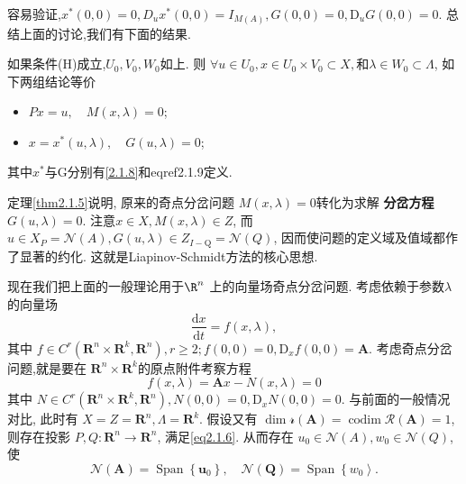 容易验证,\(x^{*}(0,0)=0, D_{u} x^{*}(0,0)=I_{M(A)},G(0,0)=0,\mathrm{D}_{u} G(0,0)=0\).
总结上面的讨论,我们有下面的结果.
\begin{theorem}
  \label{thm2.1.5}
  如果条件(H)成立,\(U_{0}, V_{0}, W_{0}\)如上.
  则
  \(\forall u \in U_{0}, x \in U_{0} \times V_{0} \subset X, \text{和}
  \lambda \in W_{0} \subset \Lambda\),
  如下两组结论等价
\begin{itemize}
\item \(P x=u, \quad M(x, \lambda)=0\);
\item \(x=x^{*}(u, \lambda), \quad G(u, \lambda)=0\);
\end{itemize}
其中\(x^{*}\)与G分别有\eqref{2.1.8}和eqref{2.1.9}定义.
\end{theorem}

定理\ref{thm2.1.5}说明,
原来的奇点分岔问题
\(M(x, \lambda)=0\)转化为求解
\textbf{分岔方程}\(G(u,\lambda)=0\).
注意\(x \in X, M(x, \lambda) \in Z\),
而
\(u \in X_{P}=\mathscr{N}(A), G(u, \lambda) \in Z_{I-\mathrm{Q}}=\mathscr{N}(Q)\),
因而使问题的定义域及值域都作了显著的约化.
这就是Liapinov-Schmidt方法的核心思想.
\par
现在我们把上面的一般理论用于$\R^{n}$
上的向量场奇点分岔问题.
考虑依赖于参数\(\lambda\)的向量场
\begin{equation}
  \label{eq2.1.10}
  \frac{\mathrm{d} x}{\mathrm{d} t}=f(x, \lambda),
\end{equation}
其中
\(
f \in C^{r}\left(\mathbf{R}^{n} \times \mathbf{R}^{k}, \mathbf{R}^{n}\right), r \geqslant 2 ; f(0,0)=0, \mathrm{D}_{x} f(0,0)=\boldsymbol{A}.
\)
考虑奇点分岔问题,就是要在
\(\mathbf{R}^{n} \times \mathbf{R}^{k}\)的原点附件考察方程
\begin{equation}
  \label{eq2.1.11}
  f(x, \lambda)=\boldsymbol{A} x-N(x, \lambda)=0
\end{equation}
其中
\(
N \in C^{r}\left(\mathbf{R}^{n} \times \mathbf{R}^{k}, \mathbf{R}^{n}\right), N(0,0)=0, \mathrm{D}_{x} N(0,0)=0.
\)
与前面的一般情况对比,
此时有
\(X=Z=\mathbf{R}^{n}, \Lambda=\mathbf{R}^{k}\).
假设又有
\(\operatorname{dim} \mathscr{r}(\boldsymbol{A})=\operatorname{codim} \mathscr{R}(\boldsymbol{A})=1\),
则存在投影
\(P, Q : \mathbf{R}^{n} \rightarrow \mathbf{R}^{n}\),
满足\eqref{eq2.1.6}.
从而存在
\(u_{0} \in \mathscr{N}(A), w_{0} \in \mathscr{N}(Q)\),使
\begin{equation*}
  \mathscr{N}(\boldsymbol{A})=\operatorname{Span}\left\{\boldsymbol{u}_{0}\right\},
  \quad
  \mathscr{N}(\boldsymbol{Q})=\operatorname{Span}\left\{w_{0}\right\rangle.
\end{equation*}
